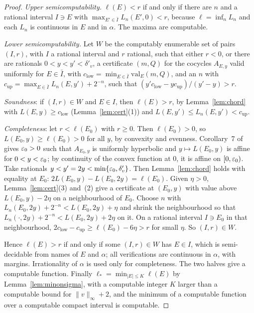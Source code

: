 \begin{proof}
\emph{Upper semicomputability.} $\ell(E)<r$ if and only if there are $n$ and a rational interval $I\ni E$ with $\max_{E'\in\bar I}L_n(E',0)<r$, because $\ell=\inf_nL_n$ and each $L_n$ is continuous in $E$ and in $\alpha$. The maxima are computable.

\emph{Lower semicomputability.} Let $W$ be the computably enumerable set of pairs $(I,r)$, with $I$ a rational interval and $r$ rational, such that either $r<0$, or there are rationals $0<y<y'<\delta'_v$, a certificate $(m,Q)$ for the cocycles $A_{E,y}$ valid uniformly for $E\in\bar I$, with $c_{\mathrm{low}}=\min_{E\in\bar I}\mathrm{val}_E(m,Q)$, and an $n$ with $c_{\mathrm{up}}=\max_{E\in\bar I}L_n(E,y')+2^{-n}$, such that $(y'c_{\mathrm{low}}-yc_{\mathrm{up}})/(y'-y)>r$.

\emph{Soundness}: if $(I,r)\in W$ and $E\in I$, then $\ell(E)>r$, by Lemma~\ref{lem:chord} with $L(E,y)\ge c_{\mathrm{low}}$ (Lemma~\ref{lem:cert}(1)) and $L(E,y')\le L_n(E,y')<c_{\mathrm{up}}$.

\emph{Completeness}: let $r<\ell(E_0)$ with $r\ge0$. Then $\ell(E_0)>0$, so $L(E_0,y)\ge\ell(E_0)>0$ for all $y$, by convexity and evenness. Corollary~7 of~\cite{Avila2015} gives $\varepsilon_0>0$ such that $A_{E_0,y}$ is uniformly hyperbolic and $y\mapsto L(E_0,y)$ is affine for $0<y<\varepsilon_0$; by continuity of the convex function at $0$, it is affine on $[0,\varepsilon_0)$. Take rationals $y<y'=2y<\min\{\varepsilon_0,\delta'_v\}$. Then Lemma~\ref{lem:chord} holds with equality at $E_0$: $2L(E_0,y)-L(E_0,2y)=\ell(E_0)$. Given $\eta>0$, Lemma~\ref{lem:cert}(3) and~(2) give a certificate at $(E_0,y)$ with value above $L(E_0,y)-2\eta$ on a neighbourhood of $E_0$. Choose $n$ with $L_n(E_0,2y)+2^{-n}<L(E_0,2y)+\eta$ and shrink the neighbourhood so that $L_n(\cdot,2y)+2^{-n}<L(E_0,2y)+2\eta$ on it. On a rational interval $I\ni E_0$ in that neighbourhood, $2c_{\mathrm{low}}-c_{\mathrm{up}}\ge\ell(E_0)-6\eta>r$ for small $\eta$. So $(I,r)\in W$.

Hence $\ell(E)>r$ if and only if some $(I,r)\in W$ has $E\in I$, which is semi-decidable from names of $E$ and $\alpha$; all verifications are continuous in $\alpha$, with margins. Irrationality of $\alpha$ is used only for completeness. The two halves give a computable function. Finally $\ell_*=\min_{|E|\le K}\ell(E)$ by Lemma~\ref{lem:minonsigma}, with a computable integer $K$ larger than a computable bound for $\|v\|_\infty+2$, and the minimum of a computable function over a computable compact interval is computable.
\end{proof}

